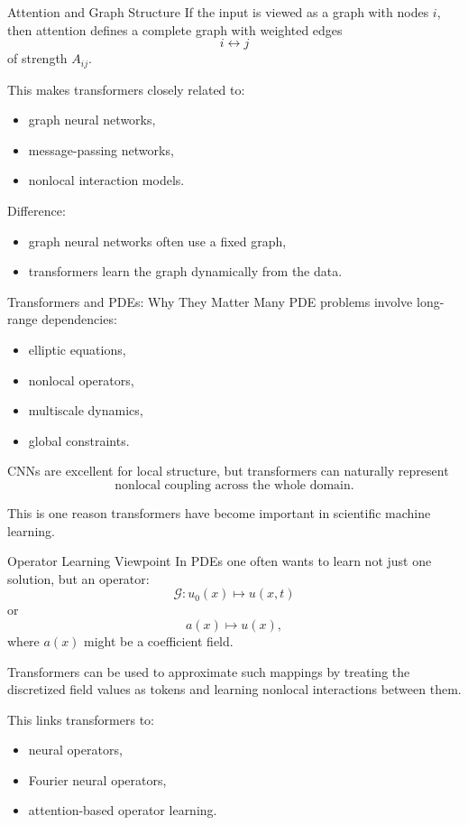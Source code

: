 \documentclass{beamer}
\begin{document}
\begin{frame}{Attention and Graph Structure}
  If the input is viewed as a graph with nodes \(i\), then attention defines a complete graph with weighted edges
  \[
  i \longleftrightarrow j
  \]
  of strength \(A_{ij}\).

  This makes transformers closely related to:
  \begin{itemize}
  \item graph neural networks,
  \item message-passing networks,
  \item nonlocal interaction models.
  \end{itemize}

  Difference:
  \begin{itemize}
  \item graph neural networks often use a fixed graph,
  \item transformers learn the graph dynamically from the data.
  \end{itemize}
\end{frame}

\begin{frame}{Transformers and PDEs: Why They Matter}
  Many PDE problems involve long-range dependencies:
  \begin{itemize}
  \item elliptic equations,
  \item nonlocal operators,
  \item multiscale dynamics,
  \item global constraints.
  \end{itemize}

  CNNs are excellent for local structure, but transformers can naturally represent
  \[
  \text{nonlocal coupling across the whole domain}.
  \]

  This is one reason transformers have become important in scientific machine learning.
\end{frame}

\begin{frame}{Operator Learning Viewpoint}
  In PDEs one often wants to learn not just one solution, but an operator:
  \[
  \mathcal{G}: u_0(x) \mapsto u(x,t)
  \]
  or
  \[
  a(x) \mapsto u(x),
  \]
  where \(a(x)\) might be a coefficient field.

  Transformers can be used to approximate such mappings by treating the discretized field values as tokens and learning nonlocal interactions between them.

  This links transformers to:
  \begin{itemize}
  \item neural operators,
  \item Fourier neural operators,
  \item attention-based operator learning.
  \end{itemize}
\end{frame}
\end{document}

